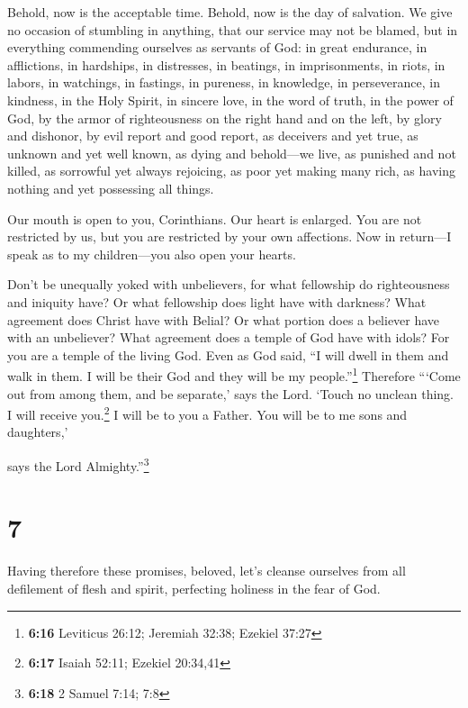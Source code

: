 Behold, now is the acceptable time. Behold, now is the day of salvation.
 We give no occasion of stumbling in anything, that our
service may not be blamed,  but in everything commending
ourselves as servants of God: in great endurance, in afflictions, in
hardships, in distresses,  in beatings, in imprisonments,
in riots, in labors, in watchings, in fastings,  in
pureness, in knowledge, in perseverance, in kindness, in the Holy
Spirit, in sincere love,  in the word of truth, in the
power of God, by the armor of righteousness on the right hand and on the
left,  by glory and dishonor, by evil report and good
report, as deceivers and yet true,  as unknown and yet
well known, as dying and behold---we live, as punished and not killed,
 as sorrowful yet always rejoicing, as poor yet making
many rich, as having nothing and yet possessing all things.

 Our mouth is open to you, Corinthians. Our heart is
enlarged.  You are not restricted by us, but you are
restricted by your own affections.  Now in return---I
speak as to my children---you also open your hearts.

 Don't be unequally yoked with unbelievers, for what
fellowship do righteousness and iniquity have? Or what fellowship does
light have with darkness?  What agreement does Christ
have with Belial? Or what portion does a believer have with an
unbeliever?  What agreement does a temple of God have
with idols? For you are a temple of the living God. Even as God said,
``I will dwell in them and walk in them. I will be their God and they
will be my people.''\footnote{\textbf{6:16} Leviticus 26:12; Jeremiah
  32:38; Ezekiel 37:27}  Therefore ```Come out from among
them, and be separate,' says the Lord. `Touch no unclean thing. I will
receive you.\footnote{\textbf{6:17} Isaiah 52:11; Ezekiel 20:34,41}
 I will be to you a Father. You will be to me sons and
daughters,'

says the Lord Almighty.''\footnote{\textbf{6:18} 2 Samuel 7:14; 7:8}

\hypertarget{section-6}{%
\section{7}\label{section-6}}

 Having therefore these promises, beloved, let's cleanse
ourselves from all defilement of flesh and spirit, perfecting holiness
in the fear of God.


